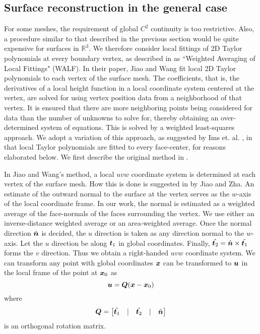 \subsection{Surface reconstruction in the general case}
For some meshes, the requirement of global $C^2$ continuity is too restrictive. Also, a procedure similar to that described in the previous section would be quite expensive for surfaces in $\mathbb{R}^3$. We therefore consider local fittings of 2D Taylor polynomials at every boundary vertex, as described in \cite{sr:jiaowang} as ``Weighted Averaging of Local Fittings" (WALF). In their paper, Jiao and Wang fit local 2D Taylor polynomials to each vertex of the surface mesh. The coefficients, that is, the derivatives of a local height function in a local coordinate system centered at the vertex, are solved for using vertex position data from a neighborhood of that vertex. It is ensured that there are more neighboring points being considered for data than the number of unknowns to solve for, thereby obtaining an over-determined system of equations. This is solved by a weighted least-squares approach. We adopt a variation of this approach, as suggested by Ims et. al. \cite{curve:meshcurve}, in that local Taylor polynomials are fitted to every face-center, for reasons elaborated below. We first describe the original method in \cite{sr:jiaowang}.

In Jiao and Wang's method, a local $uvw$ coordinate system is determined at each vertex of the surface mesh. How this is done is suggested in \cite{sr:diffquant} by Jiao and Zha. An estimate of the outward normal to the surface at the vertex serves as the $w$-axis of the local coordinate frame. In our work, the normal is estimated as a weighted average of the face-normals of the faces surrounding the vertex. We use either an inverse-distance weighted average or an area-weighted average. Once the normal direction $\hat{\boldsymbol{n}}$ is decided, the $u$ direction is taken as any direction normal to the $w$-axis. Let the $u$ direction be along $\boldsymbol{t}_1$ in global coordinates. Finally, $\hat{\boldsymbol{t}_2} = \hat{\boldsymbol{n}} \times \hat{\boldsymbol{t}_1}$ forms the $v$ direction. Thus we obtain a right-handed $uvw$ coordinate system. We can transform any point with global coordinates $\boldsymbol{x}$ can be transformed to $\boldsymbol{u}$ in the local frame of the point at $\boldsymbol{x}_0$ as
\begin{equation}
\boldsymbol{u} = \boldsymbol{Q} (\boldsymbol{x} - \boldsymbol{x}_0)
\end{equation}
where
\begin{equation}
\boldsymbol{Q} =
\begin{bmatrix}
\hat{\boldsymbol{t}_1} & \vert & \hat{\boldsymbol{t}_2} & \vert & \hat{\boldsymbol{n}}
\end{bmatrix}
\end{equation}
is an orthogonal rotation matrix.

